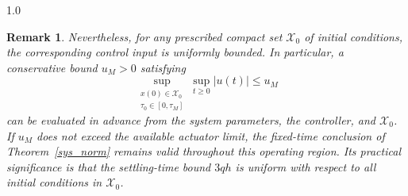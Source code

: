 \documentclass[journal]{IEEEtran}
\newtheorem{remark}{Remark}
\begin{document}
\begin{spacing}{1.0}
\begin{remark}
Nevertheless, for any prescribed compact set $\mathcal{X}_{0}$ of initial
conditions, the corresponding control input is uniformly bounded. In
particular, a conservative bound $u_{M}>0$ satisfying
\[
\sup_{\substack{x(0)\in\mathcal{X}_{0}\\
\tau_{0}\in[0,\tau_{M}]}}
\sup_{t\geq0}|u(t)|
\leq u_{M}
\]
can be evaluated in advance from the system parameters, the controller, and
$\mathcal{X}_{0}$. If $u_{M}$ does not exceed the available actuator limit,
the fixed-time conclusion of Theorem~\ref{sys_norm} remains valid throughout
this operating region. Its practical significance is that the settling-time
bound $3qh$ is uniform with respect to all initial conditions in
$\mathcal{X}_{0}$.
\end{remark}

\end{spacing}
\end{document}
